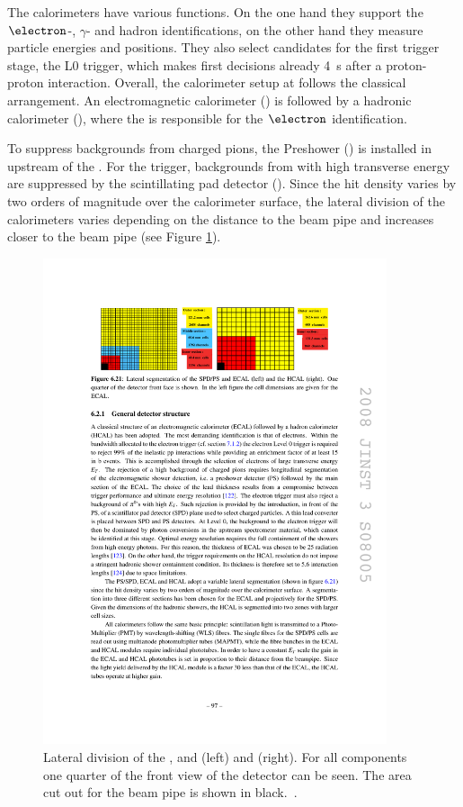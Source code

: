 The calorimeters have various functions.
On the one hand they support the $\electron$-, $\gamma$- and hadron identifications, on the other hand they measure particle energies and positions.
They also select candidates for the first trigger stage, the L0 trigger, which makes first decisions already \SI{4}{\second} after a proton-proton interaction.
Overall, the calorimeter setup at \lhcb follows the classical arrangement.
An electromagnetic calorimeter (\ecal) is followed by a hadronic calorimeter (\hcal), where the \ecal is responsible for the $\electron$ identification.

To suppress backgrounds from charged pions, the Preshower (\presh) is installed in upstream of the \ecal.
For the trigger, backgrounds from \piz with high transverse energy \et are suppressed by the scintillating pad detector (\spd).
Since the hit density varies by two orders of magnitude over the calorimeter surface, the lateral division of the calorimeters varies depending on the distance to the beam pipe and increases closer to the beam pipe (see Figure \cref{fig:calorimeter}).
\begin{figure}[tbp]
    \centering
    \includegraphics[width=0.9\textwidth]{05lhcb/figs/calorimeter.pdf}
    \caption{Lateral division of the \presh, \spd and \ecal (left) and \hcal (right).
    For all components one quarter of the front view of the detector can be seen.
    The area cut out for the beam pipe is shown in black.~\cite{Alves:2008zz}.}
    \label{fig:calorimeter}
\end{figure}


